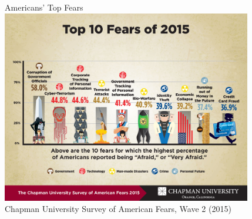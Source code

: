 \begin{frame}{Americans' Top Fears}
    \centering
    \includegraphics[width=0.82\textwidth]{img/Top10Fears.jpg} \\
    Chapman University Survey of American Fears, Wave 2 (2015) \\
\end{frame}


